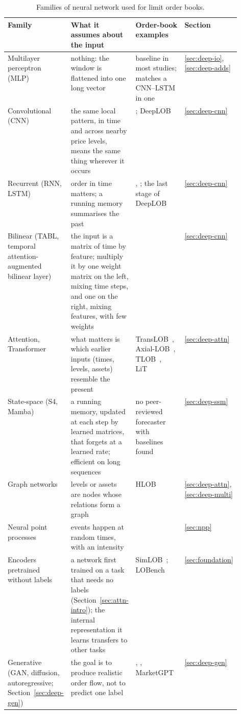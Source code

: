 \begin{table}[!htbp]
\centering\footnotesize
\caption{Families of neural network used for limit order books.}
\label{tab:deep-families}
\setlength{\tabcolsep}{3pt}
\begin{tabularx}{\linewidth}{>{\raggedright\arraybackslash}p{0.17\linewidth}>{\raggedright\arraybackslash}X>{\raggedright\arraybackslash}p{0.27\linewidth}>{\raggedright\arraybackslash}p{0.09\linewidth}}
\toprule
Family & What it assumes about the input & Order-book examples & Section \\
\midrule
Multilayer perceptron (MLP) & nothing: the window is flattened into one long vector & baseline in most studies; matches a CNN--LSTM in one~\citep{briola2020} & \ref{sec:deep-io}, \ref{sec:deep-adds} \\
Convolutional (CNN) & the same local pattern, in time and across nearby price levels, means the same thing wherever it occurs & \citet{tsantekidis2017}; DeepLOB~\citep{zhang2019} & \ref{sec:deep-cnn} \\
Recurrent (RNN, LSTM) & order in time matters; a running memory summarises the past & \citet{tsantekidis2017lstm}, \citet{dixon2018}; the last stage of DeepLOB & \ref{sec:deep-cnn} \\
Bilinear (TABL, temporal attention-augmented bilinear layer) & the input is a matrix of time by feature; multiply it by one weight matrix on the left, mixing time steps, and one on the right, mixing features, with few weights & \citet{tran2019tabl} & \ref{sec:deep-cnn} \\
Attention, Transformer & what matters is which earlier inputs (times, levels, assets) resemble the present & TransLOB~\citep{wallbridge2020}, Axial-LOB~\citep{kisiel2022axial}, TLOB~\citep{berti2025tlob}, LiT~\citep{lit2025} & \ref{sec:deep-attn} \\
State-space (S4, Mamba) & a running memory, updated at each step by learned matrices, that forgets at a learned rate; efficient on long sequences & no peer-reviewed forecaster with baselines found & \ref{sec:deep-ssm} \\
Graph networks & levels or assets are nodes whose relations form a graph & HLOB~\citep{briola2025hlob} & \ref{sec:deep-attn}, \ref{sec:deep-multi} \\
Neural point processes & events happen at random times, with an intensity & \citet{shi2022sdpnhp} & \ref{sec:npp} \\
Encoders pretrained without labels & a network first trained on a task that needs no labels (Section~\ref{sec:attn-intro}); the internal representation it learns transfers to other tasks & SimLOB~\citep{li2024simlob}; LOBench~\citep{zhong2025lobench} & \ref{sec:foundation} \\
Generative (GAN, diffusion, autoregressive; Section~\ref{sec:deep-gen}) & the goal is to produce realistic order flow, not to predict one label & \citet{coletta2022}, \citet{nagy2023}, MarketGPT~\citep{wheeler2024marketgpt} & \ref{sec:deep-gen} \\
\bottomrule
\end{tabularx}
\end{table}



